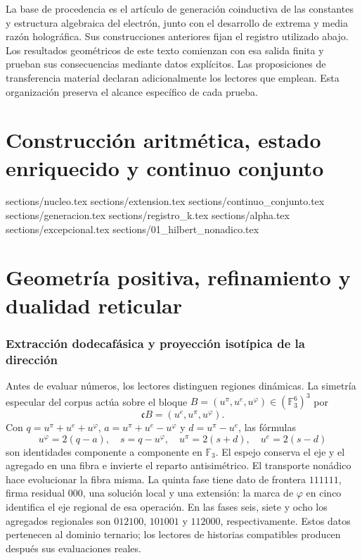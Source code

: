 \documentclass[a4paper,10pt]{article}
\theoremstyle{definition}\newtheorem{definition}[theorem]{Definición}
\theoremstyle{remark}\newtheorem{remark}[theorem]{Observación}
\newcommand{\TRIT}{\mathrm{TRIT}}\newcommand{\id}{\operatorname{id}}
\numberwithin{equation}{section}
\begin{document}
La base de procedencia es el artículo de generación coinductiva de las
constantes y estructura algebraica del electrón, junto con el desarrollo
de extrema y media razón holográfica. Sus construcciones anteriores fijan
el registro utilizado abajo. Los resultados geométricos de este texto comienzan
con esa salida finita y prueban sus consecuencias mediante datos explícitos. Las
proposiciones de transferencia material declaran adicionalmente los
lectores que emplean. Esta organización preserva el alcance específico de
cada prueba.

\clearpage
\part{Construcción aritmética, estado enriquecido y continuo conjunto}
\begingroup
\sloppy
\renewcommand{\TRIT}{\{-1,0,+1\}}
{sections/nucleo.tex}
{sections/extension.tex}
{sections/continuo_conjunto.tex}
{sections/generacion.tex}
{sections/registro_k.tex}
{sections/alpha.tex}
{sections/excepcional.tex}
{sections/01_hilbert_nonadico.tex}
\endgroup
\clearpage
\part{Geometría positiva, refinamiento y dualidad reticular}



\section{Extracción dodecafásica y proyección isotípica de la dirección}
\label{sec:register}
Antes de evaluar números, los lectores distinguen regiones dinámicas.
La simetría especular del corpus actúa sobre el bloque
\(B=(u^\pi,u^e,u^\varphi)\in(\mathbb F_3^6)^3\) por
\[
 \mathfrak cB=(u^e,u^\pi,u^\varphi).
\]
Con \(q=u^\pi+u^e+u^\varphi\),
\(a=u^\pi+u^e-u^\varphi\) y \(d=u^\pi-u^e\), las fórmulas
\[
 u^\varphi=2(q-a),\quad s=q-u^\varphi,\quad
 u^\pi=2(s+d),\quad u^e=2(s-d)
\]
son identidades componente a componente en \(\mathbb F_3\). El espejo
conserva el eje y el agregado en una fibra e invierte el reparto
antisimétrico. El transporte nonádico hace evolucionar la fibra misma.
La quinta fase tiene dato de frontera \(111111\), firma residual
\(000\), una solución local y una extensión: la marca de
\(\varphi\) en cinco identifica el eje regional de esa operación.
En las fases seis, siete y ocho los agregados regionales son
\(012100\), \(101001\) y \(112000\), respectivamente. Estos datos
pertenecen al dominio ternario; los lectores de historias compatibles
producen después sus evaluaciones reales.
\end{document}
